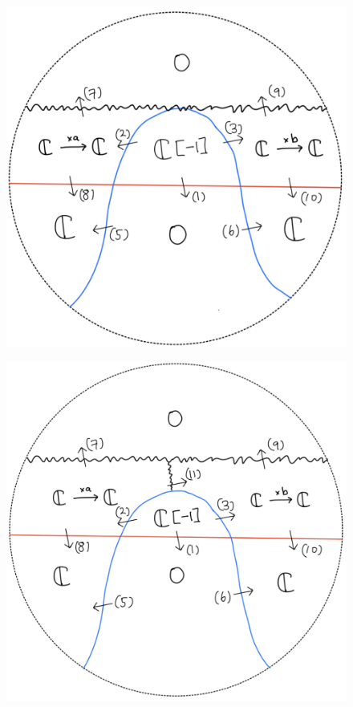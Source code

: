 \begin{figure}[H]
    \centering
    \includegraphics[scale = 0.95]{diagrams/lemma2/41.png} 
    \caption{}
    \label{fig:your-label}
\end{figure}
\begin{figure}[H]
    \centering
    \includegraphics[scale = 0.95]{diagrams/lemma2/42.png} 
    \caption{}
    \label{fig:your-label}
\end{figure}
